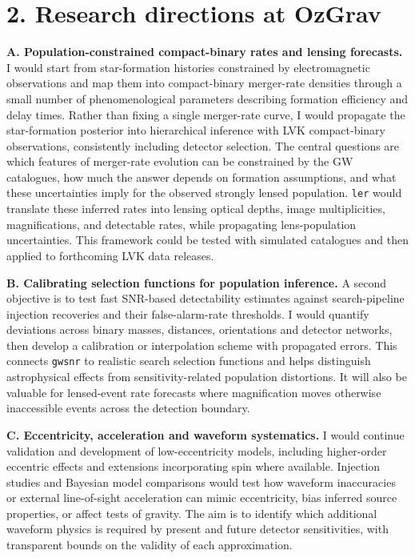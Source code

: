 \documentclass[11pt]{article}
\begin{document}
\newpage
\section*{2. Research directions at OzGrav}
\textbf{A. Population-constrained compact-binary rates and lensing forecasts.} I would start from star-formation histories constrained by electromagnetic observations and map them into compact-binary merger-rate densities through a small number of phenomenological parameters describing formation efficiency and delay times. Rather than fixing a single merger-rate curve, I would propagate the star-formation posterior into hierarchical inference with LVK compact-binary observations, consistently including detector selection. The central questions are which features of merger-rate evolution can be constrained by the GW catalogues, how much the answer depends on formation assumptions, and what these uncertainties imply for the observed strongly lensed population. \texttt{ler} would translate these inferred rates into lensing optical depths, image multiplicities, magnifications, and detectable rates, while propagating lens-population uncertainties. This framework could be tested with simulated catalogues and then applied to forthcoming LVK data releases.

\textbf{B. Calibrating selection functions for population inference.} A second objective is to test fast SNR-based detectability estimates against search-pipeline injection recoveries and their false-alarm-rate thresholds. I would quantify deviations across binary masses, distances, orientations and detector networks, then develop a calibration or interpolation scheme with propagated errors. This connects \texttt{gwsnr} to realistic search selection functions and helps distinguish astrophysical effects from sensitivity-related population distortions. It will also be valuable for lensed-event rate forecasts where magnification moves otherwise inaccessible events across the detection boundary.

\textbf{C. Eccentricity, acceleration and waveform systematics.} I would continue validation and development of low-eccentricity models, including higher-order eccentric effects and extensions incorporating spin where available. Injection studies and Bayesian model comparisons would test how waveform inaccuracies or external line-of-sight acceleration can mimic eccentricity, bias inferred source properties, or affect tests of gravity. The aim is to identify which additional waveform physics is required by present and future detector sensitivities, with transparent bounds on the validity of each approximation.
\end{document}

